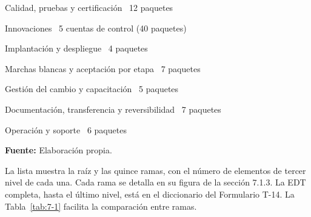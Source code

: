 \documentclass[11pt]{article}
\begin{document}
\begin{center}
\begin{minipage}{\linewidth}
{\begin{minipage}{0.96\linewidth}
\hspace*{2.2em}Calidad, pruebas y certificación \dotfill\ 12 paquetes\par
\hspace*{2.2em}Innovaciones \dotfill\ 5 cuentas de control (40 paquetes)\par
\hspace*{2.2em}Implantación y despliegue \dotfill\ 4 paquetes\par
\hspace*{2.2em}Marchas blancas y aceptación por etapa \dotfill\ 7 paquetes\par
\hspace*{2.2em}Gestión del cambio y capacitación \dotfill\ 5 paquetes\par
\hspace*{2.2em}Documentación, transferencia y reversibilidad \dotfill\ 7 paquetes\par
\hspace*{2.2em}Operación y soporte \dotfill\ 6 paquetes\par
\end{minipage}}\par\vspace{0.3em}
\raggedright\textbf{Fuente:} Elaboración propia.
\end{minipage}
\end{center}

La lista muestra la raíz y las quince ramas, con el número de elementos de tercer nivel de cada una. Cada rama se detalla en su figura de la sección 7.1.3. La EDT completa, hasta el último nivel, está en el diccionario del Formulario T-14. La Tabla~\ref{tab:7-1} facilita la comparación entre ramas.
\end{document}
